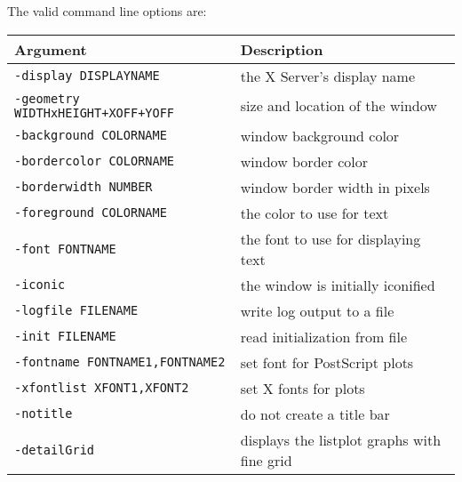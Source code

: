 The valid command line options are:\\[1.5ex]
\begin{tabular}{l|p{8cm}}
Argument & Description \\ \hline
 \verb+-display DISPLAYNAME+             & the X Server's display name
                                           \index{display@\verb+-display+}\\
 \verb|-geometry WIDTHxHEIGHT+XOFF+YOFF| & size and location of the window\\
 \verb+-background COLORNAME+            & window background color\\
 \verb+-bordercolor COLORNAME+           & window border color\\
 \verb+-borderwidth NUMBER+              & window border width in pixels\\
 \verb+-foreground COLORNAME+            & the color to use for text\\
 \verb+-font FONTNAME+                   & the font to use for displaying text\\
 \verb+-iconic+                          & the window is initially iconified\\
 \verb+-logfile FILENAME+                & write log output to a file
                                           \index{logfile@\verb+-logfile+}\\
 \verb+-init FILENAME+                   & read initialization from file
                                           \index{init@\verb+-init+}\\
 \verb+-fontname FONTNAME1,FONTNAME2+    & set font for PostScript plots\\
 \verb+-xfontlist XFONT1,XFONT2+         & set X fonts for plots\\
 \verb+-notitle+                         & do not create a title bar
                                           \index{notitle@\verb+-notitle+}\\
  \verb+-detailGrid+                     & displays the listplot graphs with fine grid
                                           \index{detailGrid@\verb+-detailGrid+}\\

\end{tabular}
